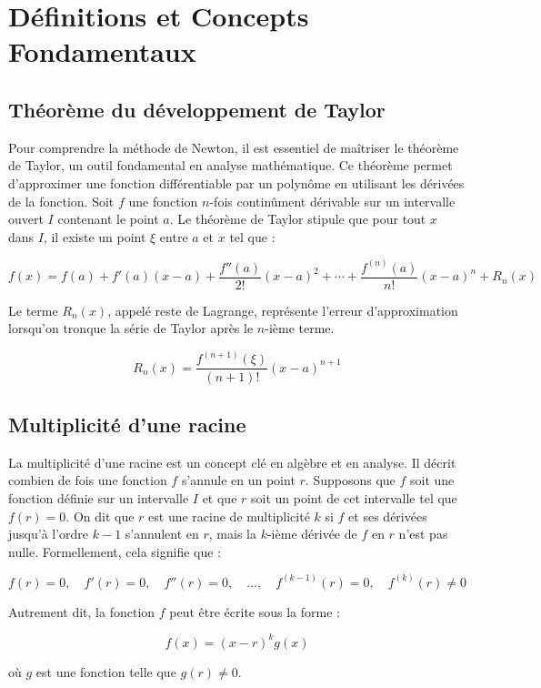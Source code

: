 \documentclass{article}
\begin{document}
\tableofcontents
\newpage

\section{Définitions et Concepts Fondamentaux}

\subsection{Théorème du développement de Taylor}
Pour comprendre la méthode de Newton, il est essentiel de maîtriser le théorème de Taylor, un outil fondamental en analyse mathématique. Ce théorème permet d'approximer une fonction différentiable par un polynôme en utilisant les dérivées de la fonction. Soit $f$ une fonction $n$-fois continûment dérivable sur un intervalle ouvert $I$ contenant le point $a$. Le théorème de Taylor stipule que pour tout $x$ dans $I$, il existe un point $\xi$ entre $a$ et $x$ tel que :

\[
f(x) = f(a) + f'(a)(x - a) + \frac{f''(a)}{2!}(x - a)^2 + \cdots + \frac{f^{(n)}(a)}{n!}(x - a)^n + R_n(x)
\]

Le terme $R_n(x)$, appelé reste de Lagrange, représente l'erreur d'approximation lorsqu'on tronque la série de Taylor après le $n$-ième terme.

\[
R_n(x) = \frac{f^{(n+1)}(\xi)}{(n+1)!}(x - a)^{n+1}
\]

\subsection{Multiplicité d'une racine}
La multiplicité d'une racine est un concept clé en algèbre et en analyse. Il décrit combien de fois une fonction $f$ s'annule en un point $r$. Supposons que $f$ soit une fonction définie sur un intervalle $I$ et que $r$ soit un point de cet intervalle tel que $f(r) = 0$. On dit que $r$ est une racine de multiplicité $k$ si $f$ et ses dérivées jusqu'à l'ordre $k-1$ s'annulent en $r$, mais la $k$-ième dérivée de $f$ en $r$ n'est pas nulle. Formellement, cela signifie que :

\[
f(r) = 0, \quad f'(r) = 0, \quad f''(r) = 0, \quad \ldots, \quad f^{(k-1)}(r) = 0, \quad f^{(k)}(r) \neq 0
\]

Autrement dit, la fonction $f$ peut être écrite sous la forme :

\[
f(x) = (x - r)^k g(x)
\]

où $g$ est une fonction telle que $g(r) \neq 0$.
\end{document}
